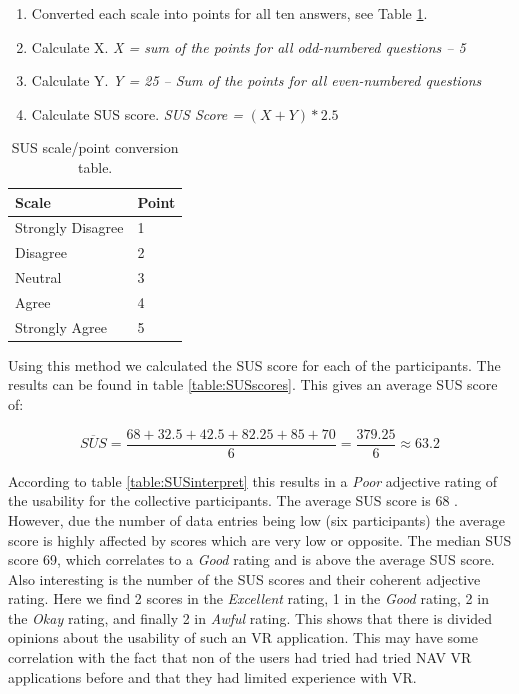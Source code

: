 \begin{enumerate}
  \item Converted each scale into points for all ten answers, see Table \ref{table:SUSconversionPoints}. 
  \item Calculate X. \textit{X = sum of the points for all odd-numbered questions – 5}  
  \item Calculate Y. \textit{Y =  25 – Sum of the points for all even-numbered questions}
  \item Calculate SUS score. \textit{SUS Score =} $(X + Y) * 2.5$ 
\end{enumerate}


\begin{table}[H]
\centering
\begin{tabular}{l|l}
{ \textbf{Scale}} & { \textbf{Point}} \\ \hline
Strongly Disagree                     & 1                                     \\ 
Disagree                              & 2                                     \\ 
Neutral                               & 3                                     \\ 
Agree                                 & 4                                     \\ 
Strongly Agree                        & 5                                     \\ 
\end{tabular}
\caption{SUS scale/point conversion table.}
\label{table:SUSconversionPoints}
\end{table}

Using this method we calculated the SUS score for each of the participants. The results can be found in table \ref{table:SUSscores}. This gives an average SUS score of: 

\[\overline{SUS} = \frac{68 + 32.5 + 42.5 + 82.25 + 85 + 70}{6} = \frac{379.25}{6} \approx 63.2\]

According to table \ref{table:SUSinterpret} this results in a \textit{Poor} adjective rating of the usability for the collective participants. The average SUS score is 68 \cite{SusMeasuringInterpret}. However, due the number of data entries being low (six participants) the average score is highly affected by scores which are very low or opposite. The median SUS score 69, which correlates to a \textit{Good} rating and is above the average SUS score. Also interesting is the number of the SUS scores and their coherent adjective rating. Here we find 2 scores in the \textit{Excellent} rating, 1 in the \textit{Good} rating, 2 in the \textit{Okay} rating, and finally 2 in \textit{Awful} rating. This shows that there is divided opinions about the usability of such an VR application. This may have some correlation with the fact that non of the users had tried had tried NAV VR applications before and that they had limited experience with VR. 




